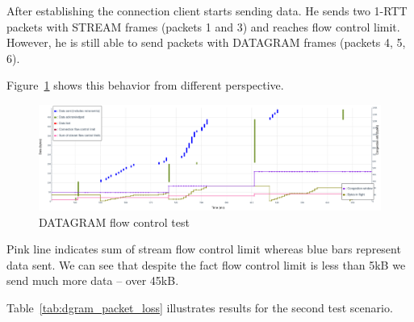 After establishing the connection client starts sending data.
He sends two 1-RTT packets with STREAM frames (packets 1 and 3) and reaches flow control limit.
However, he is still able to send packets with DATAGRAM frames (packets 4, 5, 6).

Figure~\ref{fig:dgram_flow_control2} shows this behavior from different perspective.
\begin{figure}
    \centering
    \includegraphics[width=\textwidth]{img/__09__datagrams/dgram_flow_control_2.png}
    \caption{DATAGRAM flow control test}
    \label{fig:dgram_flow_control2}
\end{figure}
Pink line indicates sum of stream flow control limit whereas blue bars represent data sent.
We can see that despite the fact flow control limit is less than 5kB we send much more data -- over 45kB\@.



Table~\ref{tab:dgram_packet_loss} illustrates results for the second test scenario.

\begin{table}
    \centering
    \caption{\label{tab:dgram_packet_loss}Number of packets sent with and without packet loss for DATAGRAM frames.}
\end{table}


